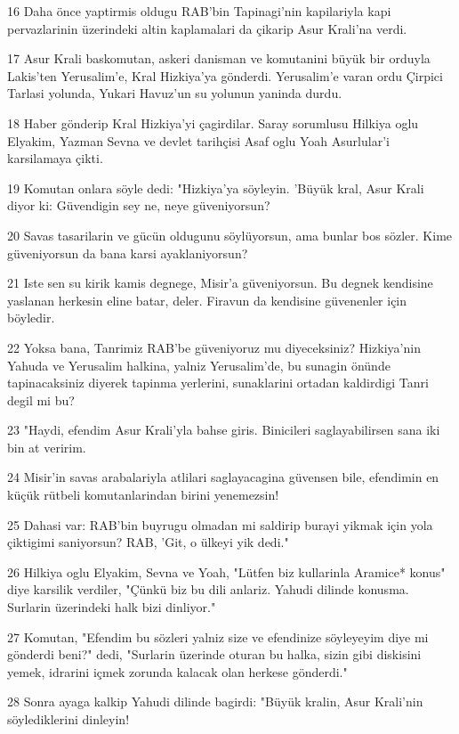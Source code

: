 \par 16 Daha önce yaptirmis oldugu RAB'bin Tapinagi'nin kapilariyla kapi pervazlarinin üzerindeki altin kaplamalari da çikarip Asur Krali'na verdi.
\par 17 Asur Krali baskomutan, askeri danisman ve komutanini büyük bir orduyla Lakis'ten Yerusalim'e, Kral Hizkiya'ya gönderdi. Yerusalim'e varan ordu Çirpici Tarlasi yolunda, Yukari Havuz'un su yolunun yaninda durdu.
\par 18 Haber gönderip Kral Hizkiya'yi çagirdilar. Saray sorumlusu Hilkiya oglu Elyakim, Yazman Sevna ve devlet tarihçisi Asaf oglu Yoah Asurlular'i karsilamaya çikti.
\par 19 Komutan onlara söyle dedi: "Hizkiya'ya söyleyin. 'Büyük kral, Asur Krali diyor ki: Güvendigin sey ne, neye güveniyorsun?
\par 20 Savas tasarilarin ve gücün oldugunu söylüyorsun, ama bunlar bos sözler. Kime güveniyorsun da bana karsi ayaklaniyorsun?
\par 21 Iste sen su kirik kamis degnege, Misir'a güveniyorsun. Bu degnek kendisine yaslanan herkesin eline batar, deler. Firavun da kendisine güvenenler için böyledir.
\par 22 Yoksa bana, Tanrimiz RAB'be güveniyoruz mu diyeceksiniz? Hizkiya'nin Yahuda ve Yerusalim halkina, yalniz Yerusalim'de, bu sunagin önünde tapinacaksiniz diyerek tapinma yerlerini, sunaklarini ortadan kaldirdigi Tanri degil mi bu?
\par 23 "Haydi, efendim Asur Krali'yla bahse giris. Binicileri saglayabilirsen sana iki bin at veririm.
\par 24 Misir'in savas arabalariyla atlilari saglayacagina güvensen bile, efendimin en küçük rütbeli komutanlarindan birini yenemezsin!
\par 25 Dahasi var: RAB'bin buyrugu olmadan mi saldirip burayi yikmak için yola çiktigimi saniyorsun? RAB, 'Git, o ülkeyi yik dedi."
\par 26 Hilkiya oglu Elyakim, Sevna ve Yoah, "Lütfen biz kullarinla Aramice* konus" diye karsilik verdiler, "Çünkü biz bu dili anlariz. Yahudi dilinde konusma. Surlarin üzerindeki halk bizi dinliyor."
\par 27 Komutan, "Efendim bu sözleri yalniz size ve efendinize söyleyeyim diye mi gönderdi beni?" dedi, "Surlarin üzerinde oturan bu halka, sizin gibi diskisini yemek, idrarini içmek zorunda kalacak olan herkese gönderdi."
\par 28 Sonra ayaga kalkip Yahudi dilinde bagirdi: "Büyük kralin, Asur Krali'nin söylediklerini dinleyin!
